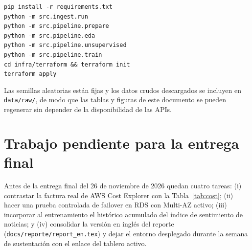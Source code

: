 \documentclass[conference]{IEEEtran}
\begin{document}
{\scriptsize
\begin{verbatim}
pip install -r requirements.txt
python -m src.ingest.run
python -m src.pipeline.prepare
python -m src.pipeline.eda
python -m src.pipeline.unsupervised
python -m src.pipeline.train
cd infra/terraform && terraform init
terraform apply
\end{verbatim}
}

Las semillas aleatorias están fijas y los datos crudos descargados se incluyen en \texttt{data/raw/}, de modo que las tablas y figuras de este documento se pueden regenerar sin depender de la disponibilidad de las APIs.

\section{Trabajo pendiente para la entrega final}
Antes de la entrega final del 26 de noviembre de 2026 quedan cuatro tareas: (i) contrastar la factura real de AWS Cost Explorer con la Tabla~\ref{tab:cost}; (ii) hacer una prueba controlada de failover en RDS con Multi-AZ activo; (iii) incorporar al entrenamiento el histórico acumulado del índice de sentimiento de noticias; y (iv) consolidar la versión en inglés del reporte (\texttt{docs/reporte/report\_en.tex}) y dejar el entorno desplegado durante la semana de sustentación con el enlace del tablero activo.
\end{document}

